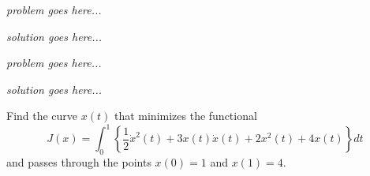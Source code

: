 \documentclass[11pt,letterpaper,boxed,cm]{./hmcpset}
\begin{document}
 {
\vspace{-2cm}

\setcounter{equation}{0}
\begin{problem}[1]
  \emph{problem goes here...}
\end{problem}

\begin{solution}
\emph{solution goes here...}
\end{solution}
\newpage

\setcounter{equation}{0}
\begin{problem}[2]
  \emph{problem goes here...}
\end{problem}

\begin{solution}
\emph{solution goes here...}
\end{solution}
\newpage

\setcounter{equation}{0}
\begin{problem}[Example]
  Find the curve $x(t)$ that minimizes the functional
\[  J(x) = \int_{0}^{1} \left\{ \frac{1}{2} \dot{x}^2(t) + 3 x(t)\dot{x}(t) + 2x^2(t) + 4x(t) \right\} dt \]
and passes through the points $x(0) = 1$ and $x(1) = 4$.
\end{problem}

}
\end{document}
